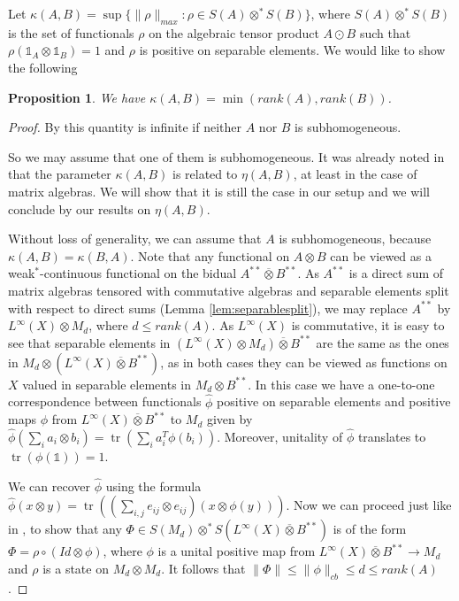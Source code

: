 \documentclass[11pt]{article}
\numberwithin{theorem}{section}
\newtheorem{prop}[theorem]{Proposition}
\newcommand{\tr}{\operatorname{tr}}
\begin{document}
Let $\kappa(A,B) = \sup\{\|\rho\|_{max}: \rho \in S(A) \otimes^{\ast} S(B)\}$, where $S(A) \otimes^{\ast} S(B)$ is the set of functionals $\rho$ on the algebraic tensor product $A\odot B$ such that $\rho(\mathds{1}_{A}\otimes \mathds{1}_{B}) = 1$ and $\rho$ is positive on separable elements. We would like to show the following
\begin{prop}
We have $\kappa(A,B) = \min(rank(A), rank(B))$.
\end{prop}
\begin{proof}
By \cite[Proposition 3.14 (iii)]{MusatRordam} this quantity is infinite if neither $A$ nor $B$ is subhomogeneous.

So we may assume that one of them is subhomogeneous. It was already noted in \cite[Proposition 3.4, Theorem 3.15]{MusatRordam} that the parameter $\kappa(A,B)$ is related to $\eta(A,B)$, at least in the case of matrix algebras. We will show that it is still the case in our setup and we will conclude by our results on $\eta(A,B)$.

Without loss of generality, we can assume that $A$ is subhomogeneous, because $\kappa(A,B) = \kappa(B,A)$. Note that any functional on $A \otimes B$ can be viewed as a weak$^{\ast}$-continuous functional on the bidual $A^{\ast\ast}\overline{\otimes} B^{\ast\ast}$. As $A^{\ast\ast}$ is a direct sum of matrix algebras tensored with commutative algebras and separable elements split with respect to direct sums (Lemma \ref{lem:separablesplit}), we may replace $A^{\ast\ast}$ by $L^{\infty}(X) \otimes M_{d}$, where $d\leqslant rank(A)$. As $L^{\infty}(X)$ is commutative, it is easy to see that separable elements in $(L^{\infty}(X)\otimes M_d)\overline{\otimes} B^{\ast\ast}$ are the same as the ones in $M_d \otimes (L^{\infty}(X)\overline{\otimes} B^{\ast\ast})$, as in both cases they can be viewed as functions on $X$ valued in separable elements in $M_{d} \otimes B^{\ast\ast}$. In this case we have a one-to-one correspondence between functionals  $\widehat{\phi}$ positive on separable elements and positive maps $\phi$ from $L^{\infty}(X)\overline{\otimes} B^{\ast\ast}$ to $M_d$ given by $\widehat{\phi}(\sum_{i} a_{i} \otimes b_{i}) = \tr(\sum_{i} a_{i}^{T} \phi(b_i))$. Moreover, unitality of $\widehat{\phi}$ translates to $\tr(\phi(\mathds{1})) = 1$. 

We can recover $\widehat{\phi}$ using the formula $\widehat{\phi}(x\otimes y) = \tr((\sum_{i,j} e_{ij} \otimes e_{ij})(x \otimes \phi(y)))$. Now we can proceed just like in \cite[Proposition 3.4]{MusatRordam}, to show that any $\Phi \in S(M_d) \otimes^{\ast} S(L^{\infty}(X)\overline{\otimes}B^{\ast\ast})$ is of the form $\Phi = \rho \circ (Id \otimes \phi)$, where $\phi$ is a unital positive map from $L^{\infty}(X)\overline{\otimes} B^{\ast\ast} \to M_d$ and $\rho$ is a state on $M_d \otimes M_d$. It follows that $\|\Phi\| \leqslant \|\phi\|_{cb}\leqslant d\leqslant rank(A)$.


\end{proof}
\end{document}
